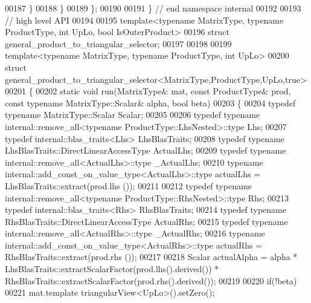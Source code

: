 \begin{DoxyCode}
00187     \}
00188   \}
00189 \};
00190 
00191 \} \textcolor{comment}{// end namespace internal}
00192 
00193 \textcolor{comment}{// high level API}
00194 
00195 \textcolor{keyword}{template}<\textcolor{keyword}{typename} MatrixType, \textcolor{keyword}{typename} ProductType, \textcolor{keywordtype}{int} UpLo, \textcolor{keywordtype}{bool} IsOuterProduct>
00196 \textcolor{keyword}{struct }general\_product\_to\_triangular\_selector;
00197 
00198 
00199 \textcolor{keyword}{template}<\textcolor{keyword}{typename} MatrixType, \textcolor{keyword}{typename} ProductType, \textcolor{keywordtype}{int} UpLo>
00200 \textcolor{keyword}{struct }general\_product\_to\_triangular\_selector<MatrixType,ProductType,UpLo,true>
00201 \{
00202   \textcolor{keyword}{static} \textcolor{keywordtype}{void} run(MatrixType& mat, \textcolor{keyword}{const} ProductType& prod, \textcolor{keyword}{const} \textcolor{keyword}{typename} MatrixType::Scalar& alpha, \textcolor{keywordtype}{bool} 
      beta)
00203   \{
00204     \textcolor{keyword}{typedef} \textcolor{keyword}{typename} MatrixType::Scalar Scalar;
00205     
00206     \textcolor{keyword}{typedef} \textcolor{keyword}{typename} internal::remove\_all<typename ProductType::LhsNested>::type Lhs;
00207     \textcolor{keyword}{typedef} internal::blas\_traits<Lhs> LhsBlasTraits;
00208     \textcolor{keyword}{typedef} \textcolor{keyword}{typename} LhsBlasTraits::DirectLinearAccessType ActualLhs;
00209     \textcolor{keyword}{typedef} \textcolor{keyword}{typename} internal::remove\_all<ActualLhs>::type \_ActualLhs;
00210     \textcolor{keyword}{typename} internal::add\_const\_on\_value\_type<ActualLhs>::type actualLhs = LhsBlasTraits::extract(prod.lhs
      ());
00211     
00212     \textcolor{keyword}{typedef} \textcolor{keyword}{typename} internal::remove\_all<typename ProductType::RhsNested>::type Rhs;
00213     \textcolor{keyword}{typedef} internal::blas\_traits<Rhs> RhsBlasTraits;
00214     \textcolor{keyword}{typedef} \textcolor{keyword}{typename} RhsBlasTraits::DirectLinearAccessType ActualRhs;
00215     \textcolor{keyword}{typedef} \textcolor{keyword}{typename} internal::remove\_all<ActualRhs>::type \_ActualRhs;
00216     \textcolor{keyword}{typename} internal::add\_const\_on\_value\_type<ActualRhs>::type actualRhs = RhsBlasTraits::extract(prod.rhs
      ());
00217 
00218     Scalar actualAlpha = alpha * LhsBlasTraits::extractScalarFactor(prod.lhs().derived()) * 
      RhsBlasTraits::extractScalarFactor(prod.rhs().derived());
00219 
00220     \textcolor{keywordflow}{if}(!beta)
00221       mat.template triangularView<UpLo>().setZero();

\end{DoxyCode}
